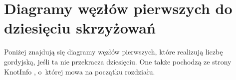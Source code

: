 
\section{Diagramy węzłów pierwszych do dziesięciu skrzyżowań}
Poniżej znajdują się diagramy węzłów pierwszych, które realizują liczbę gordyjską, jeśli ta nie przekracza dziesięciu.
One także pochodzą ze strony KnotInfo \cite{knotinfo2024}, o~której mowa na początku rozdziału.

